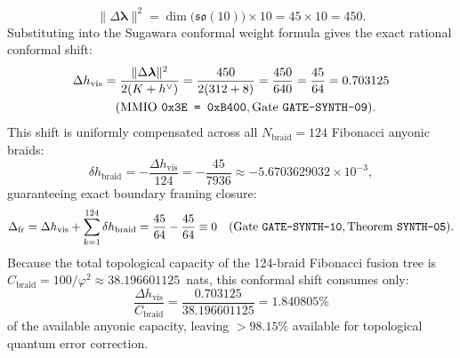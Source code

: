 \documentclass[11pt,onecolumn]{article}
\begin{document}
\begin{equation}
\|\Delta\bm{\lambda}\|^2 = \dim\bigl(\mathfrak{so}(10)\bigr) \times 10 = 45 \times 10 = 450.
\label{eq:norm_sq_450}
\end{equation}
Substituting into the Sugawara conformal weight formula gives the exact rational conformal shift:
\begin{equation}
\begin{split}
\Delta h_{\text{vis}} &= \frac{\|\Delta\bm{\lambda}\|^2}{2(K + h^\vee)} = \frac{450}{2(312 + 8)} = \frac{450}{640} = \frac{45}{64} = 0.703125 \\
&\quad (\text{MMIO \texttt{0x3E = 0xB400}}, \text{Gate \texttt{GATE-SYNTH-09}}).
\end{split}
\label{eq:delta_h_vis_45_64}
\end{equation}
This shift is uniformly compensated across all $N_{\text{braid}} = 124$ Fibonacci anyonic braids:
\begin{equation}
\delta h_{\text{braid}} = -\frac{\Delta h_{\text{vis}}}{124} = -\frac{45}{7936} \approx -5.6703629032\times 10^{-3},
\label{eq:delta_h_braid_val}
\end{equation}
guaranteeing exact boundary framing closure:
\begin{equation}
\Delta_{\text{fr}} = \Delta h_{\text{vis}} + \sum_{k=1}^{124} \delta h_{\text{braid}} = \frac{45}{64} - \frac{45}{64} \equiv 0 \quad (\text{Gate \texttt{GATE-SYNTH-10}}, \text{Theorem \texttt{SYNTH-05}}).
\label{eq:framing_zero_mar}
\end{equation}
Because the total topological capacity of the 124-braid Fibonacci fusion tree is $C_{\text{braid}} = 100/\varphi^2 \approx 38.196601125$~nats, this conformal shift consumes only:
\begin{equation}
\frac{\Delta h_{\text{vis}}}{C_{\text{braid}}} = \frac{0.703125}{38.196601125} = 1.840805\%
\label{eq:braid_fraction}
\end{equation}
of the available anyonic capacity, leaving $>98.15\%$ available for topological quantum error correction.
\end{document}

